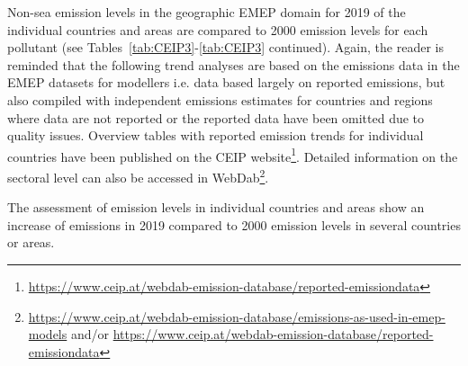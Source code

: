 Non-sea emission levels in the geographic EMEP domain for 2019 of the individual countries and areas are compared to 2000 emission levels for each pollutant (see Tables~\ref{tab:CEIP3}-\ref{tab:CEIP3} continued). Again, the reader is reminded that the following trend analyses are based on the emissions data in the EMEP datasets for modellers i.e. data based largely on reported emissions, but also compiled with independent emissions estimates for countries and regions where data are not reported or the reported data have been omitted due to quality issues. Overview tables with reported emission trends for individual countries have been published on the CEIP website\footnote{\url{https://www.ceip.at/webdab-emission-database/reported-emissiondata}}. Detailed information on the sectoral level can also be accessed in WebDab\footnote{\url{https://www.ceip.at/webdab-emission-database/emissions-as-used-in-emep-models} and/or \url{https://www.ceip.at/webdab-emission-database/reported-emissiondata}}.

The assessment of emission levels in individual countries and areas show an increase of emissions in 2019 compared to 2000 emission levels in several countries or areas.


